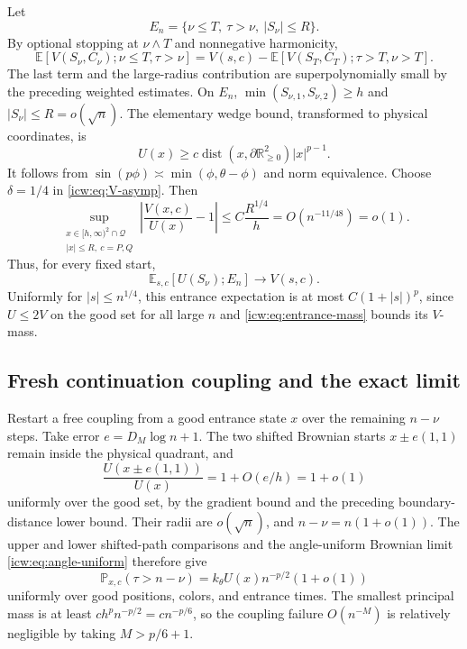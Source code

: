 \documentclass[11pt,letterpaper]{article}
\theoremstyle{remark}\newtheorem{remark}[theorem]{Remark}
\newcommand{\RR}{\mathbb R}
\newcommand{\Prob}{\mathbb P}
\newcommand{\E}{\mathbb E}
\newcommand{\Qd}{\mathcal Q}
\newcommand{\1}{\mathbf1}
\DeclareMathOperator{\dist}{dist}
\begin{document}
Let
\[
 E_n=\{\nu\le T,\ \tau>\nu,\ |S_\nu|\le R\}.
\]
By optional stopping at $\nu\wedge T$ and nonnegative harmonicity,
\begin{equation}\label{icw:eq:entrance-mass}
 \E[V(S_\nu,C_\nu);\nu\le T,\tau>\nu]
 =V(s,c)-\E[V(S_T,C_T);\tau>T,\nu>T].
\end{equation}
The last term and the large-radius contribution are superpolynomially
small by the preceding weighted estimates. On $E_n$,
$\min(S_{\nu,1},S_{\nu,2})\ge h$ and $|S_\nu|\le R=o(\sqrt n)$.
The elementary wedge bound, transformed to physical coordinates, is
\[
 U(x)\ge c\dist(x,\partial\RR_{\ge0}^2)|x|^{p-1}.
\]
It follows from $\sin(p\phi)\asymp\min(\phi,\theta-\phi)$ and
norm equivalence. Choose $\delta=1/4$ in \eqref{icw:eq:V-asymp}. Then
\begin{equation}\label{icw:eq:entrance-ratio}
 \sup_{\substack{x\in[h,\infty)^2\cap\Qd\\|x|\le R,\ c=P,Q}}
 \left|\frac{V(x,c)}{U(x)}-1\right|
 \le C\frac{R^{1/4}}h=O(n^{-11/48})=o(1).
\end{equation}
Thus, for every fixed start,
\begin{equation}\label{icw:eq:U-entrance-mass}
 \E_{s,c}[U(S_\nu);E_n]\longrightarrow V(s,c).
\end{equation}
Uniformly for $|s|\le n^{1/4}$, this entrance expectation is at most
$C(1+|s|)^p$, since $U\le2V$ on the good set for all large $n$ and
\eqref{icw:eq:entrance-mass} bounds its $V$-mass.

\subsection{Fresh continuation coupling and the exact limit}
Restart a free coupling from a good entrance state $x$ over the remaining
$n-\nu$ steps. Take error $e=D_M\log n+1$. The two shifted Brownian
starts $x\pm e(1,1)$ remain inside the physical quadrant, and
\[
 \frac{U(x\pm e(1,1))}{U(x)}=1+O(e/h)=1+o(1)
\]
uniformly over the good set, by the gradient bound and the preceding
boundary-distance lower bound. Their radii are $o(\sqrt n)$, and
$n-\nu=n(1+o(1))$. The upper and lower shifted-path comparisons and
the angle-uniform Brownian limit \eqref{icw:eq:angle-uniform} therefore give
\begin{equation}\label{icw:eq:continuation}
 \Prob_{x,c}(\tau>n-\nu)=k_\theta U(x)n^{-p/2}(1+o(1))
\end{equation}
uniformly over good positions, colors, and entrance times. The smallest
principal mass is at least $c h^p n^{-p/2}=c n^{-p/6}$, so the
coupling failure $O(n^{-M})$ is relatively negligible by taking
$M>p/6+1$.
\end{document}
